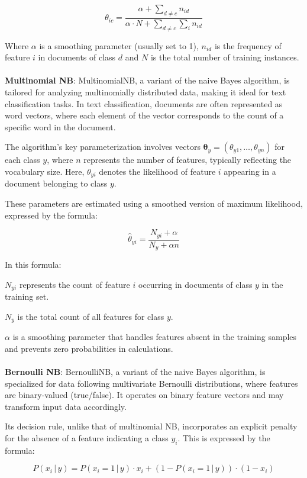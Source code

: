 \documentclass[11pt]{article} %
\begin{document}
\[ \theta_{ic} = \frac{{\alpha + \sum_{d \neq c} {n_{id}}}}{{\alpha \cdot N + \sum_{d \neq c} {\sum_i {n_{id}}}}}\]

Where \( \alpha \) is a smoothing parameter (usually set to 1), \( n_{id} \) is the frequency of feature \( i \) in documents of class \( d \) and
\( N \) is the total number of training instances.
\\
\\
\textbf{Multinomial NB}: MultinomialNB, a variant of the naive Bayes algorithm, is tailored for analyzing multinomially distributed data, making it ideal for text classification tasks. In text classification, documents are often represented as word vectors, where each element of the vector corresponds to the count of a specific word in the document.

The algorithm's key parameterization involves vectors $\boldsymbol{\theta}_y = (\theta_{y1}, \ldots, \theta_{yn})$ for each class $y$, where $n$ represents the number of features, typically reflecting the vocabulary size. Here, $\theta_{yi}$ denotes the likelihood of feature $i$ appearing in a document belonging to class $y$.

These parameters are estimated using a smoothed version of maximum likelihood, expressed by the formula:

\[
\hat{\theta}_{yi} = \frac{N_{yi} + \alpha}{N_{y} + \alpha n}
\]

In this formula:

$N_{yi}$ represents the count of feature $i$ occurring in documents of class $y$ in the training set.

$N_{y}$ is the total count of all features for class $y$.

$\alpha$ is a smoothing parameter that handles features absent in the training samples and prevents zero probabilities in calculations.
\\
\\
\textbf{Bernoulli NB}: BernoulliNB, a variant of the naive Bayes algorithm, is specialized for data following multivariate Bernoulli distributions, where features are binary-valued (true/false). It operates on binary feature vectors and may transform input data accordingly.

Its decision rule, unlike that of multinomial NB, incorporates an explicit penalty for the absence of a feature indicating a class $y_i$. This is expressed by the formula:

\[
P(x_i \,|\, y) = P(x_i = 1 \,|\, y) \cdot x_i + (1 - P(x_i = 1 \,|\, y)) \cdot (1 - x_i)
\]
\end{document}
